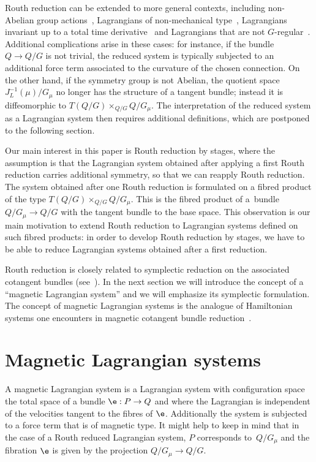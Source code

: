Routh reduction can be extended to more general contexts, including non-Abelian group actions~\cite{marsdenrouth},  Lagrangians of non-mechanical type~\cite{adamec,mestcram},   Lagrangians invariant up to a total time derivative~\cite{BC} and  Lagrangians that are not $G$-regular~\cite{BM}.  Additional complications arise in these cases: for instance, if the bundle $Q\to Q/G$ is not trivial, the reduced system is typically subjected to an additional force term associated to the curvature of the chosen connection. On the other hand, if the symmetry group is not Abelian, the quotient space $J^{-1}_L(\mu)/G_\mu$ no longer has the structure of a tangent bundle; instead it is dif\/feomorphic to $T(Q/G)\times_{Q/G} Q/G_\mu$. The interpretation of the reduced system as a Lagrangian system then requires additional def\/initions, which are postponed to the following section.

Our main interest in this paper is Routh reduction by stages, where the assumption is that the Lagrangian system obtained after applying a f\/irst Routh reduction carries additional symmetry, so that we can reapply Routh reduction. The system obtained after one Routh reduction is formulated on a f\/ibred product of the type $T(Q/G)\times_{Q/G} Q/G_\mu$. This is the f\/ibred product of a~bundle $Q/G_\mu \to Q/G$ with the tangent bundle to the base space. This observation is our main motivation to extend Routh reduction to Lagrangian systems def\/ined on such f\/ibred products:  in order to develop Routh reduction by stages, we have to be able to reduce Lagrangian systems obtained after a f\/irst reduction.

Routh reduction is closely related to symplectic reduction on the associated cotangent bundles (see~\cite{BC,marsdenrouth}). In the next section we will introduce the concept of a ``magnetic Lagrangian system'' and we will emphasize its symplectic formulation. The concept of magnetic Lagrangian systems is the analogue of Hamiltonian systems one encounters in magnetic cotangent bundle reduction~\cite{MarsdenHamRed}.

\section{Magnetic Lagrangian systems}\label{section3}

A magnetic Lagrangian system is a Lagrangian system with conf\/iguration space the total space of a bundle $\e:P\to Q$ and where the Lagrangian is independent of the velocities tangent to the f\/ibres of $\e$. Additionally the system is subjected to a force term that is of magnetic type. It might help to keep in mind that in the case of a Routh reduced Lagrangian system, $P$ corresponds to~$Q/G_\mu$ and the f\/ibration $\e$ is given by the projection $Q/G_\mu \to Q/G$.

